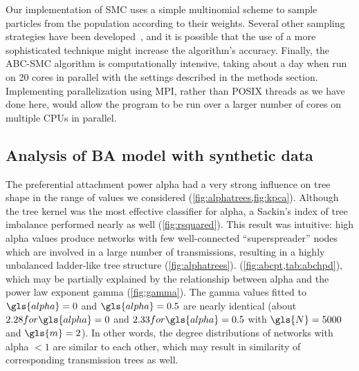 Our implementation of \gls{SMC} uses a simple multinomial scheme to sample
particles from the population according to their weights. Several other
sampling strategies have been developed~\autocite{douc2005comparison}, and it
is possible that the use of a more sophisticated technique might increase the
algorithm's accuracy. Finally, the \gls{ABC}-\gls{SMC} algorithm is
computationally intensive, taking about a day when run on 20 cores in parallel
with the settings described in the methods section. Implementing
parallelization using \gls{MPI}, rather than \gls{POSIX} threads as we have
done here, would allow the program to be run over a larger number of cores on
multiple CPUs in parallel.

\subsection{Analysis of \acrlong{BA} model with synthetic data}

The preferential attachment power \gls{alpha} had a very strong influence on
tree shape in the range of values we considered
(\cref{fig:alphatrees,fig:kpca}). Although the tree kernel was the most
effective classifier for \gls{alpha}, a Sackin's index of tree imbalance
performed nearly as well (\cref{fig:rsquared}). This result was intuitive: high
\gls{alpha} values produce networks with few well-connected ``superspreader''
nodes which are involved in a large number of transmissions, resulting in a
highly unbalanced ladder-like tree structure (\cref{fig:alphatrees}). 
 
(\cref{fig:abcpt,tab:abchpd}), which may be partially explained by the
relationship between \gls{alpha} and the power law exponent \gls{gamma}
(\cref{fig:gamma}).  The \gls{gamma} values fitted to $\gls{alpha} = 0$
and $\gls{alpha} = 0.5$ are nearly identical (about $2.28 for \gls{alpha} = 0$
and $2.33 for \gls{alpha} = 0.5$ with $\gls{N} = 5000$ and $\gls{m} = 2$). In
other words, the degree distributions of networks with \gls{alpha} $< 1$ are
similar to each other, which may result in similarity of corresponding
transmission trees as well. 

